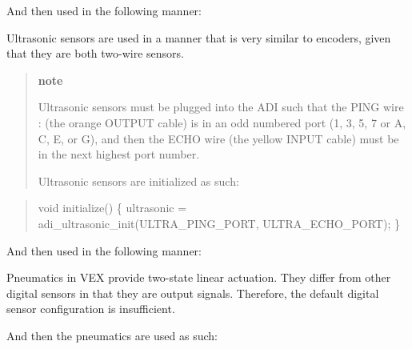 And then used in the following manner\+:

Ultrasonic sensors are used in a manner that is very similar to encoders, given that they are both two-\/wire sensors.

\begin{quote}
{\bfseries note}

Ultrasonic sensors must be plugged into the A\+DI such that the P\+I\+NG wire \+: (the orange O\+U\+T\+P\+UT cable) is in an odd numbered port (1, 3, 5, 7 or \textquotesingle{}A\textquotesingle{}, \textquotesingle{}C\textquotesingle{}, \textquotesingle{}E\textquotesingle{}, or \textquotesingle{}G\textquotesingle{}), and then the E\+C\+HO wire (the yellow I\+N\+P\+UT cable) must be in the next highest port number.

Ultrasonic sensors are initialized as such\+: \end{quote}


\begin{quote}

\begin{DoxyCode}
void initialize() \{
  ultrasonic = adi\_ultrasonic\_init(ULTRA\_PING\_PORT, ULTRA\_ECHO\_PORT);
\}
\end{DoxyCode}
 \end{quote}


And then used in the following manner\+:

Pneumatics in V\+EX provide two-\/state linear actuation. They differ from other digital sensors in that they are output signals. Therefore, the default digital sensor configuration is insufficient.

And then the pneumatics are used as such\+: 